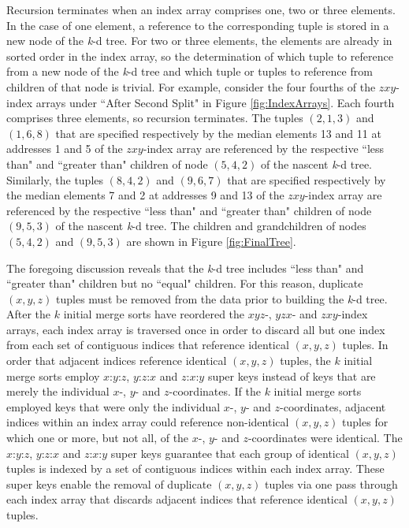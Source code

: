\documentclass{sig-alternate}
\begin{document}
Recursion terminates when an index array comprises one, two or three elements.  In the case of one element, a reference to the corresponding tuple is stored in a new node of the \emph{k}-d tree.  For two or three elements, the elements are already in sorted order in the index array, so the determination of which tuple to reference from a new node of the \emph{k}-d tree and which tuple or tuples to reference from children of that node is trivial.  For example, consider the four fourths of the $zxy$-index arrays under ``After Second Split" in Figure \ref{fig:IndexArrays}.  Each fourth comprises three elements, so recursion terminates.  The tuples $\left(2,1,3\right)$ and $\left(1,6,8\right)$ that are specified respectively by the median elements 13 and 11 at addresses 1 and 5 of the $zxy$-index array are referenced by the respective ``less than" and ``greater than" children of node $\left(5,4,2\right)$ of the nascent \emph{k}-d tree.  Similarly, the tuples $\left(8,4,2\right)$ and $\left(9,6,7\right)$ that are specified respectively by the median elements 7 and 2 at addresses 9 and 13 of the $zxy$-index array are referenced by the respective ``less than" and ``greater than" children of node $\left(9,5,3\right)$ of the nascent \emph{k}-d tree.  The children and grandchildren of nodes $\left(5,4,2\right)$ and $\left(9,5,3\right)$ are shown in Figure \ref{fig:FinalTree}.

The foregoing discussion reveals that the \emph{k}-d tree includes ``less than" and ``greater than" children but no ``equal" children.  For this reason, duplicate $\left(x,y,z\right)$ tuples must be removed from the data prior to building the \emph{k}-d tree.  After the $k$ initial merge sorts have reordered the $xyz$-, $yzx$- and $zxy$-index arrays, each index array is traversed once in order to discard all but one index from each set of contiguous indices that reference identical $\left(x,y,z\right)$ tuples.  In order that adjacent indices reference identical $\left(x,y,z\right)$ tuples, the $k$ initial merge sorts employ $x$:$y$:$z$, $y$:$z$:$x$ and $z$:$x$:$y$ super keys instead of keys that are merely the individual $x$-, $y$- and $z$-coordinates.  If the $k$ initial merge sorts employed keys that were only the individual $x$-, $y$- and $z$-coordinates, adjacent indices within an index array could reference non-identical $\left(x,y,z\right)$ tuples for which one or more, but not all, of the $x$-, $y$- and $z$-coordinates were identical.  The $x$:$y$:$z$, $y$:$z$:$x$ and $z$:$x$:$y$ super keys guarantee that each group of identical $\left(x,y,z\right)$ tuples is indexed by a set of contiguous indices within each index array.  These super keys enable the removal of duplicate $\left(x,y,z\right)$ tuples via one pass through each index array that discards adjacent indices that reference identical $\left(x,y,z\right)$ tuples.
\end{document}

